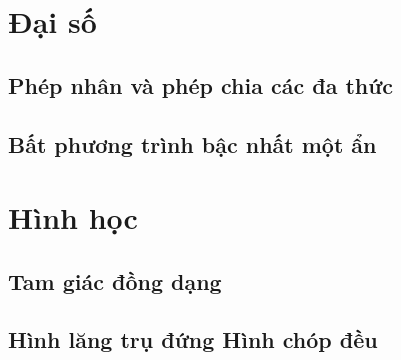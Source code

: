 \documentclass[12pt,a4paper]{extbook}
\theoremstyle{nonumberplain}
\begin{document}

\tableofcontents
{}
\part{Đại số}
\chapter{Phép nhân và phép chia các đa thức}



\chapter{Bất phương trình bậc nhất một ẩn}



\part{Hình học}
\chapter{Tam giác đồng dạng}





\chapter{Hình lăng trụ đứng Hình chóp đều}


\end{document}
